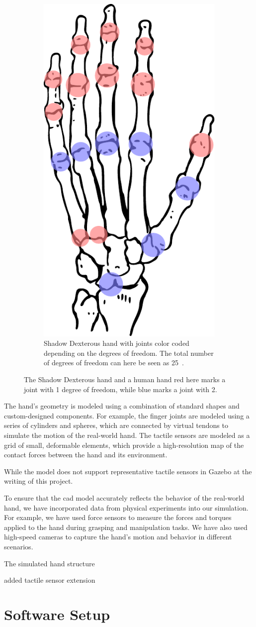 \begin{figure}[h]
\begin{subfigure}[b]{0.48\textwidth}
		\centering
		\includegraphics[height=\textwidth]{chapters/system-setup/fig/human-skeleton-hand.pdf}
		\caption{Shadow Dexterous hand with joints color coded depending on the degrees of freedom. The total number of degrees of freedom can here be seen as \num{25}~\cite{design-and-development-of-a-bilateral-therapeutic-hand-device-for-stroke-rehabilitation}.}
		\label{fig:human-hand-skeleton}
	\end{subfigure}
	\caption{The Shadow Dexterous hand and a human hand red here marks a joint with \num{1} degree of freedom, while blue marks a joint with \num{2}.}
	\label{fig:hands-dof}
\end{figure}

The hand's geometry is modeled using a combination of standard shapes and custom-designed components. For example, the finger joints are modeled using a series of cylinders and spheres, which are connected by virtual tendons to simulate the motion of the real-world hand. The tactile sensors are modeled as a grid of small, deformable elements, which provide a high-resolution map of the contact forces between the hand and its environment.\medskip

While the model does not support representative tactile sensors in Gazebo at the writing of this project.


To ensure that the \gls{cad} model accurately reflects the behavior of the real-world hand, we have incorporated data from physical experiments into our simulation. For example, we have used force sensors to measure the forces and torques applied to the hand during grasping and manipulation tasks. We have also used high-speed cameras to capture the hand's motion and behavior in different scenarios.\medskip


The simulated hand structure


added tactile sensor extension



\section{Software Setup} \label{sec:system-setup-software-setup}




